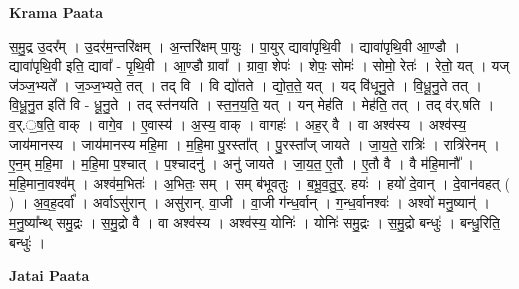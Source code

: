 \documentclass[17pt]{extarticle}
\begin{document}
\textbf{Krama Paata} \newline

स॒मु॒द्र उ॒दर᳚म् । उ॒दर॑म॒न्तरि॑क्षम् । अ॒न्तरि॑क्षम् पा॒युः । पा॒युर् द्यावा॑पृथि॒वी । द्यावा॑पृथि॒वी आ॒ण्डौ । द्यावा॑पृथि॒वी इति॒ द्यावा᳚ - पृ॒थि॒वी । आ॒ण्डौ ग्रावा᳚ । ग्रावा॒ शेपः॑ । शेपः॒ सोमः॑ । सोमो॒ रेतः॑ । रेतो॒ यत् । 
यज् ज॑ञ्ज॒भ्यते᳚ । ज॒ञ्ज॒भ्यते॒ तत् । तद् वि । वि द्यो॑तते । द्यो॒त॒ते॒ यत् । यद् वि॑धूनु॒ते । वि॒धू॒नु॒ते तत् । वि॒धू॒नु॒त इति॑ वि - धू॒नु॒ते । तद् स्त॑नयति । स्त॒न॒य॒ति॒ यत् । यन् मेह॑ति । मेह॑ति॒ तत् । तद् व॑र्.षति । व॒र्.॒ष॒ति॒ वाक् । वागे॒व । ए॒वास्य॑ । अ॒स्य॒ वाक् । वागहः॑ । अह॒र् वै । वा अश्व॑स्य । अश्व॑स्य॒ जाय॑मानस्य । जाय॑मानस्य महि॒मा । म॒हि॒मा पु॒रस्ता᳚त् । पु॒रस्ता᳚ज् जायते । जा॒य॒ते॒ रात्रिः॑ । रात्रि॑रेनम् । ए॒न॒म् म॒हि॒मा । म॒हि॒मा प॒श्चात् । प॒श्चादनु॑ । अनु॑ जायते । जा॒य॒त॒ ए॒तौ । ए॒तौ वै । वै म॑हि॒मानौ᳚ । म॒हि॒माना॒वश्व᳚म् । अश्व॑म॒भितः॑ । अ॒भितः॒ सम् । सम् ब॑भूवतुः । ब॒भू॒व॒तु॒र्॒. हयः॑ । हयो॑ दे॒वान् । दे॒वान॑वहत् ( ) । अ॒व॒ह॒दर्वा᳚ । अर्वाऽसु॑रान् । असु॑रान्. वा॒जी । वा॒जी ग॑न्ध॒र्वान् । ग॒न्ध॒र्वानश्वः॑ । अश्वो॑ मनु॒ष्यान्॑ । म॒नु॒ष्या᳚न्थ् समु॒द्रः । स॒मु॒द्रो वै । वा अश्व॑स्य । अश्व॑स्य॒ योनिः॑ । योनिः॑ समु॒द्रः । स॒मु॒द्रो बन्धुः॑ । बन्धु॒रिति॒ बन्धुः॑ । \newline

\textbf{Jatai Paata} \newline
\end{document}

